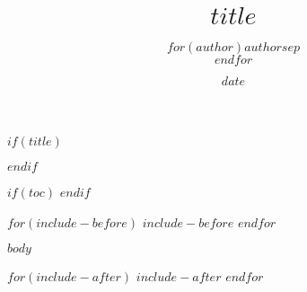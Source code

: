 \documentclass[11pt]{article}
\title{\textbf{$title$}}
\author{\small{$for(author)$$author$$sep$\\$endfor$}}
\date{$date$}
\date{}
\begin{document}
  
  
  
$if(title)$
\maketitle
$endif$   

$if(toc)$
\tableofcontents
$endif$

$for(include-before)$
$include-before$
$endfor$

$body$

$for(include-after)$
$include-after$
$endfor$
\end{document}
